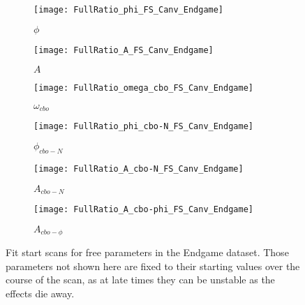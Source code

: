 \begin{figure}[]
\centering
    \begin{subfigure}[]{0.45\textwidth}
        \centering
        \texttt{[image: FullRatio\_phi\_FS\_Canv\_Endgame]}
        \caption{$\phi$}
    \end{subfigure}%
    \begin{subfigure}[]{0.45\textwidth}
        \centering
        \texttt{[image: FullRatio\_A\_FS\_Canv\_Endgame]}
        \caption{$A$}
    \end{subfigure}

    \begin{subfigure}[]{0.45\textwidth}
        \centering
        \texttt{[image: FullRatio\_omega\_cbo\_FS\_Canv\_Endgame]}
        \caption{$\omega_{cbo}$}
    \end{subfigure}%
    \begin{subfigure}[]{0.45\textwidth}
        \centering
        \texttt{[image: FullRatio\_phi\_cbo-N\_FS\_Canv\_Endgame]}
        \caption{$\phi_{cbo-N}$}
    \end{subfigure}

    \begin{subfigure}[]{0.45\textwidth}
        \centering
        \texttt{[image: FullRatio\_A\_cbo-N\_FS\_Canv\_Endgame]}
        \caption{$A_{cbo-N}$}
    \end{subfigure}%
    \begin{subfigure}[]{0.45\textwidth}
        \centering
        \texttt{[image: FullRatio\_A\_cbo-phi\_FS\_Canv\_Endgame]}
        \caption{$A_{cbo-\phi}$}
    \end{subfigure}
\caption[Fit start scans for free parameters in the Endgame dataset]{Fit start scans for free parameters in the Endgame dataset. Those parameters not shown here are fixed to their starting values over the course of the scan, as at late times they can be unstable as the effects die away.}
\label{fig:fitStartScan_EndgamePars}
\end{figure}


